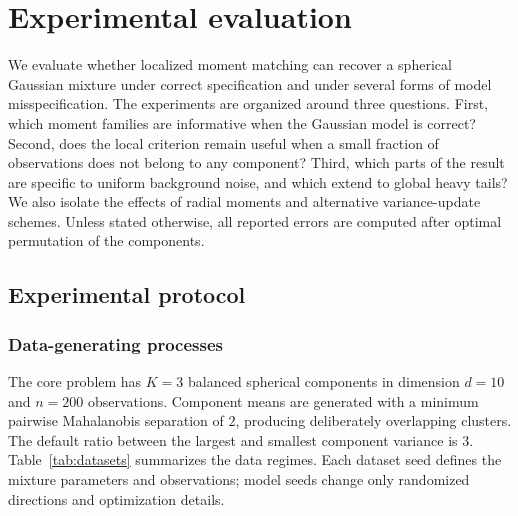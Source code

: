 \documentclass[11pt,a4paper]{article}
\begin{document}
\setcounter{section}{3}
\setcounter{page}{12}

\section{Experimental evaluation}
\label{sec:experiments}

We evaluate whether localized moment matching can recover a spherical
Gaussian mixture under correct specification and under several forms of
model misspecification.  The experiments are organized around three
questions.  First, which moment families are informative when the Gaussian
model is correct?  Second, does the local criterion remain useful when a
small fraction of observations does not belong to any component?  Third,
which parts of the result are specific to uniform background noise, and which
extend to global heavy tails?  We also isolate the effects of radial moments
and alternative variance-update schemes.  Unless stated otherwise, all
reported errors are computed after optimal permutation of the components.

\subsection{Experimental protocol}
\label{sec:exp_protocol}

\subsubsection{Data-generating processes}

The core problem has $K=3$ balanced spherical components in dimension
$d=10$ and $n=200$ observations.  Component means are generated with a
minimum pairwise Mahalanobis separation of $2$, producing deliberately
overlapping clusters.  The default ratio between the largest and smallest
component variance is $3$.  Table~\ref{tab:datasets} summarizes the data
regimes.  Each dataset seed defines the mixture parameters and observations;
model seeds change only randomized directions and optimization details.
\end{document}
